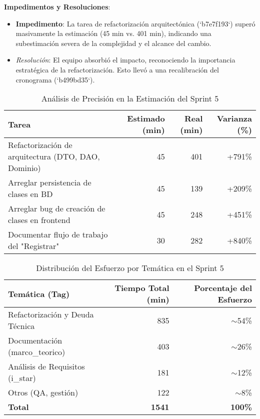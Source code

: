 \textbf{Impedimentos y Resoluciones}:
\begin{itemize}
    \item \textbf{Impedimento}: La tarea de refactorización arquitectónica (`b7e7f193`) superó masivamente la estimación (45 min vs. 401 min), indicando una subestimación severa de la complejidad y el alcance del cambio.
    \item \textit{Resolución}: El equipo absorbió el impacto, reconociendo la importancia estratégica de la refactorización. Esto llevó a una recalibración del cronograma (`b499bd35`).
\end{itemize}

\begin{table}[H]
    \caption{Análisis de Precisión en la Estimación del Sprint 5}
    \label{tab:sprint-5-estimation-accuracy}
    \begin{tabularx}{\textwidth}{@{}Xrrr@{}}
        \toprule
        \textbf{Tarea} & \textbf{Estimado (min)} & \textbf{Real (min)} & \textbf{Varianza (\%)} \\
        \midrule
        Refactorización de arquitectura (DTO, DAO, Dominio) & 45 & 401 & +791\% \\
        Arreglar persistencia de clases en BD & 45 & 139 & +209\% \\
        Arreglar bug de creación de clases en frontend & 45 & 248 & +451\% \\
        Documentar flujo de trabajo del "Registrar" & 30 & 282 & +840\% \\
        \bottomrule
    \end{tabularx}
\end{table}

\begin{table}[H]
    \caption{Distribución del Esfuerzo por Temática en el Sprint 5}
    \label{tab:sprint-5-effort-distribution}
    \begin{tabularx}{\textwidth}{@{}Xrr@{}}
        \toprule
        \textbf{Temática (Tag)} & \textbf{Tiempo Total (min)} & \textbf{Porcentaje del Esfuerzo} \\
        \midrule
        Refactorización y Deuda Técnica & 835 & $\sim$54\% \\
        Documentación (marco\_teorico) & 403 & $\sim$26\% \\
        Análisis de Requisitos (i\_star) & 181 & $\sim$12\% \\
        Otros (QA, gestión) & 122 & $\sim$8\% \\
        \midrule
        \textbf{Total} & \textbf{1541} & \textbf{100\%} \\
        \bottomrule
    \end{tabularx}
\end{table}

